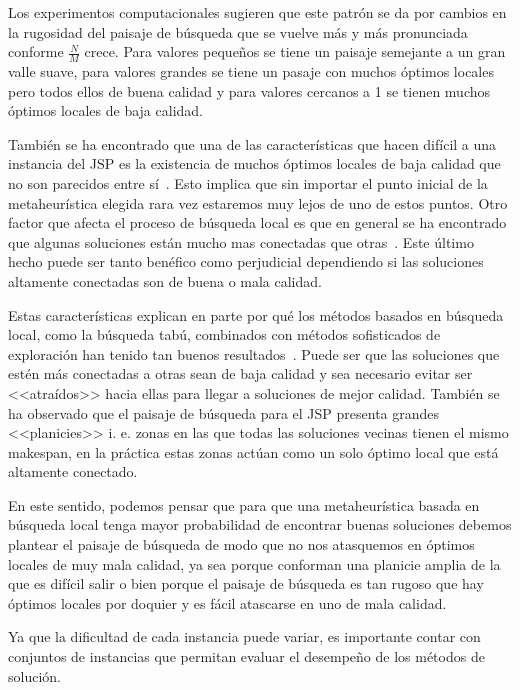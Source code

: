 Los experimentos computacionales sugieren que este patrón se da por cambios en la rugosidad del paisaje de búsqueda que se vuelve más y más pronunciada conforme $\frac{N}{M}$ crece.
%
Para valores pequeños se tiene un paisaje semejante a un gran valle suave, para valores grandes se tiene un pasaje con muchos óptimos locales pero todos ellos de buena calidad y 
para valores cercanos a 1 se tienen muchos óptimos locales de baja calidad.

También se ha encontrado que una de las características que hacen difícil a una instancia del JSP es la existencia de muchos óptimos locales de baja calidad que no son 
parecidos entre sí~\cite{mattfeld1999search}. 
%
Esto implica que sin importar el punto inicial de la metaheurística elegida rara vez estaremos muy lejos de uno de estos puntos. 
%
Otro factor que afecta el proceso de búsqueda local es que en general se ha encontrado que algunas soluciones están mucho mas conectadas que otras~\cite{bierwirth2004landscape}. 
%
Este último hecho puede ser tanto benéfico como perjudicial dependiendo si las soluciones altamente conectadas son de buena o mala calidad. 

Estas características explican en parte por qué los métodos basados en búsqueda local, como la búsqueda tabú, combinados con métodos sofisticados de exploración 
han tenido tan buenos resultados~\cite{watson2003problem}. 
%
Puede ser que las soluciones que estén más conectadas a otras sean de baja calidad y sea necesario evitar ser <<atraídos>> hacia ellas para llegar a soluciones de mejor calidad. 
%
También se ha observado que el paisaje de búsqueda para el JSP presenta grandes <<planicies>> i. e. zonas en las que todas las soluciones vecinas tienen el mismo makespan, 
en la práctica estas zonas actúan como un solo óptimo local que está altamente conectado.

En este sentido, podemos pensar que para que una metaheurística basada en búsqueda local tenga mayor probabilidad de encontrar buenas soluciones 
debemos plantear el paisaje de búsqueda de modo que no nos atasquemos en óptimos locales de muy mala calidad, ya sea porque conforman una planicie
amplia de la que es difícil salir o bien porque el paisaje de búsqueda es tan rugoso que hay óptimos locales por doquier y es fácil atascarse en uno de 
mala calidad. 

Ya que la dificultad de cada instancia puede variar, es importante contar con conjuntos de instancias que permitan evaluar el desempeño de los métodos de solución. 

